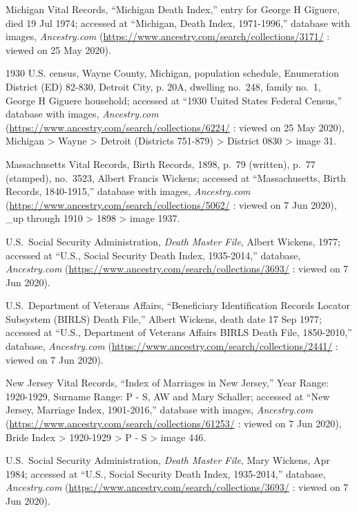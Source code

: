 \begin{thebibliography}{999}
Michigan Vital Records, ``Michigan Death Index,'' entry for George H Giguere, died 19 Jul 1974; accessed at ``Michigan, Death Index, 1971-1996,'' database with images, \textit{Ancestry.com} (\url{https://www.ancestry.com/search/collections/3171/} : viewed on 25 May 2020).

1930 U.S. census, Wayne County, Michigan, population schedule, Enumeration District (ED) 82-830, Detroit City, p. 20A, dwelling no.\ 248, family no.\ 1, George H Giguere household; accessed at ``1930 United States Federal Census,'' database with images, \textit{Ancestry.com} (\url{https://www.ancestry.com/search/collections/6224/} : viewed on 25 May 2020), Michigan > Wayne > Detroit (Districts 751-879) > District 0830 > image 31.


Massachusetts Vital Records, Birth Records, 1898, p.\ 79 (written), p.\ 77 (stamped), no.\ 3523, Albert Francis Wickens; accessed at ``Massachusetts, Birth Records, 1840-1915,'' database with images, \textit{Ancestry.com} (\url{https://www.ancestry.com/search/collections/5062/} : viewed on 7 Jun 2020), \_up through 1910 > 1898 > image 1937.

U.S.\ Social Security Administration, \textit{Death Master File}, Albert Wickens, 1977; accessed at ``U.S., Social Security Death Index, 1935-2014,'' database, \textit{Ancestry.com} (\url{https://www.ancestry.com/search/collections/3693/} : viewed on 7 Jun 2020).

U.S.\ Department of Veterans Affairs, ``Beneficiary Identification Records Locator Subsystem (BIRLS) Death File,'' Albert Wickens, death date 17 Sep 1977; accessed at ``U.S., Department of Veterans Affairs BIRLS Death File, 1850-2010,'' database, \textit{Ancestry.com} (\url{https://www.ancestry.com/search/collections/2441/} : viewed on 7 Jun 2020).

New Jersey Vital Records, ``Index of Marriages in New Jersey,'' Year Range: 1920-1929, Surname Range: P - S, AW and Mary Schaller; accessed at ``New Jersey, Marriage Index, 1901-2016,'' database with images, \textit{Ancestry.com} (\url{https://www.ancestry.com/search/collections/61253/} : viewed on 7 Jun 2020), Bride Index > 1920-1929 > P - S > image 446.

U.S.\ Social Security Administration, \textit{Death Master File}, Mary Wickens, Apr 1984; accessed at ``U.S., Social Security Death Index, 1935-2014,'' database, \textit{Ancestry.com} (\url{https://www.ancestry.com/search/collections/3693/} : viewed on 7 Jun 2020).


\end{thebibliography}
